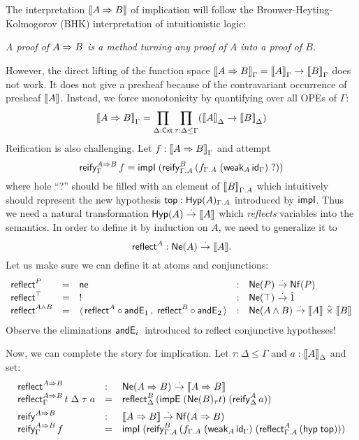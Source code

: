 \documentclass[a4paper]{article}
\begin{document}
The interpretation $\den{A \imp B}$ of implication will follow the
Brouwer-Heyting-Kolmogorov (BHK) interpretation of intuitionistic
logic:
\begin{center}\itshape
  A proof of $A \imp B$ is a method turning any proof of $A$ into a
  proof of $B$.
\end{center}
However, the direct lifting of the function space $\den{A \imp
  B}_\Gamma = \den A_\Gamma \to \den B_\Gamma$ does not work.  It does
not give a presheaf because of the contravariant occurrence of
presheaf $\den A$.  Instead, we force monotonicity by quantifying over
all OPEs of $\Gamma$:
\[
  \den{A \imp B}_\Gamma = \prod_{\Delta : \Cxt} \prod_{\tau : \Delta \leq \Gamma} (\den A
  _\Delta \to \den B _\Delta)
\]
Reification is also challenging.  Let $f : \den{A \imp B}_\Gamma$ and
attempt
\[
  \reify[\Gamma]{A \imp B} f %
    = \impIP {\reify[\Gamma.A]B{(f_{\Gamma.A}\;(\weak[A]{\id[\Gamma]})}\;\mbox{?})}
\]
where hole ``?'' should be filled with an element of $\den B_{\Gamma.A}$
which intuitively should represent the new hypothesis $\ttop :
\Hyp[\Gamma.A]A$ introduced by $\timpI$.  Thus we need a natural
transformation $\Hyp A \todot \den A$ which \emph{reflects} variables
into the semantics.  In order to define it by
induction on $A$, we need to generalize it to
\[
  \treflect^A : \Ne A \todot \den A
  .
\]
Let us make sure we can define it at atoms and conjunctions:
\[
\begin{array}{lllll}
  \treflect^P & = & \tne & : & \Ne P \todot \Nf P \\
  \treflect^\top & = & !  & : & \Ne \top \todot \hatone \\
  \treflect^{A \land B} & = & \langle\, \treflect^A \comp \andE1  , \;
                             \treflect^B \comp \andE2 \rangle
    & : & \Ne{A \land B} \todot \den A \hattimes \den B \\
\end{array}
\]
Observe the eliminations $\andE i$ introduced to reflect conjunctive hypotheses!

Now, we can complete the story for implication.  Let $\tau : \Delta
\leq \Gamma$ and $a : \den A_\Delta$ and set:
\[
\begin{array}{lll}
  \treflect^{A \imp B} & : & \Ne{A \imp B} \todot \den{A \imp B} \\
  \reflect[\Gamma]{A \imp B} t\;\Delta\;\tau\;a & = &
    \reflect[\Delta]B{(\impEP {\Ne[\tau] B t} {(\reify[\Delta] A a)})}
\\[1ex]
  \treify^{A \imp B} & : & \den{A \imp B} \todot \Nf{A \imp B} \\
  \reify[\Gamma]{A \imp B} f & = &
    \impIP {\reify[\Gamma.A]B{(f_{\Gamma.A}\;(\weak[A]{\id[\Gamma]})}\;(\reflect[\Gamma.A]A{(\hyp\ttop)})}
\end{array}
\]
\end{document}
